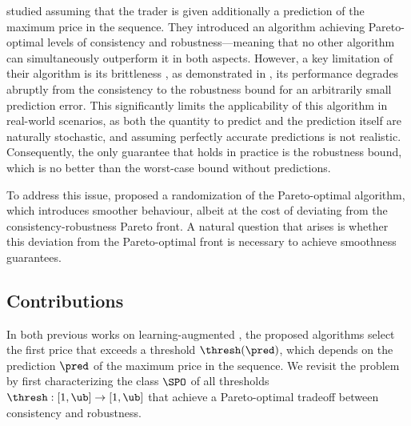 \citet{sun_pareto-optimal_2021} studied \OMS{} assuming that the trader is given additionally a prediction of the maximum price in the sequence. They
introduced an algorithm achieving Pareto-optimal levels of consistency and robustness—meaning that no other algorithm can simultaneously outperform it in both aspects. However, a key limitation of their algorithm is its brittleness \cite{}, as demonstrated in \cite{benomar2025tradeoffs}, \ie its performance degrades abruptly from the consistency to the robustness bound for an arbitrarily small prediction error. This significantly limits the applicability of this algorithm in real-world scenarios, as both the quantity to predict and the prediction itself are naturally stochastic, and assuming perfectly accurate predictions is not realistic. Consequently, the only guarantee that holds in practice is the robustness bound, which is no better than the worst-case bound without predictions. 

To address this issue, \citet{benomar2025tradeoffs} proposed a randomization of the Pareto-optimal algorithm, which introduces smoother behaviour, albeit at the cost of deviating from the consistency-robustness Pareto front. A natural question that arises is whether this deviation from the Pareto-optimal front is necessary to achieve smoothness guarantees.



\subsection{Contributions}
In both previous works on learning-augmented \OMS{} \cite{sun_pareto-optimal_2021, benomar2025tradeoffs}, the proposed algorithms select the first price that exceeds a threshold $\thresh(\pred)$, which depends on the prediction $\pred$ of the maximum price in the sequence.
We revisit the problem by first characterizing the class $\SPO$ of all thresholds $\thresh: [1,\ub] \to [1,\ub]$ that achieve a Pareto-optimal tradeoff between consistency and robustness.

